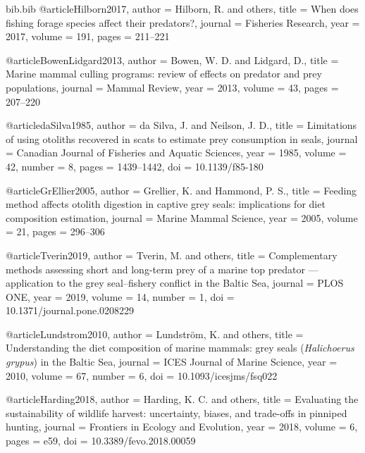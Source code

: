\begin{filecontents*}{bib.bib}
@article{Hilborn2017,
  author  = {Hilborn, R. and others},
  title   = {When does fishing forage species affect their predators?},
  journal = {Fisheries Research},
  year    = {2017},
  volume  = {191},
  pages   = {211--221}
}

@article{BowenLidgard2013,
  author  = {Bowen, W. D. and Lidgard, D.},
  title   = {Marine mammal culling programs: review of effects on predator and prey populations},
  journal = {Mammal Review},
  year    = {2013},
  volume  = {43},
  pages   = {207--220}
}

@article{daSilva1985,
  author  = {da Silva, J. and Neilson, J. D.},
  title   = {Limitations of using otoliths recovered in scats to estimate prey consumption in seals},
  journal = {Canadian Journal of Fisheries and Aquatic Sciences},
  year    = {1985},
  volume  = {42},
  number  = {8},
  pages   = {1439--1442},
  doi     = {10.1139/f85-180}
}

@article{GrEllier2005,
  author  = {Grellier, K. and Hammond, P. S.},
  title   = {Feeding method affects otolith digestion in captive grey seals: implications for diet composition estimation},
  journal = {Marine Mammal Science},
  year    = {2005},
  volume  = {21},
  pages   = {296--306}
}

@article{Tverin2019,
  author  = {Tverin, M. and others},
  title   = {Complementary methods assessing short and long-term prey of a marine top predator --- application to the grey seal--fishery conflict in the {B}altic {S}ea},
  journal = {PLOS ONE},
  year    = {2019},
  volume  = {14},
  number  = {1},
  doi     = {10.1371/journal.pone.0208229}
}

@article{Lundstrom2010,
  author  = {Lundstr{\"o}m, K. and others},
  title   = {Understanding the diet composition of marine mammals: grey seals (\textit{Halichoerus grypus}) in the {B}altic {S}ea},
  journal = {ICES Journal of Marine Science},
  year    = {2010},
  volume  = {67},
  number  = {6},
  doi     = {10.1093/icesjms/fsq022}
}

@article{Harding2018,
  author  = {Harding, K. C. and others},
  title   = {Evaluating the sustainability of wildlife harvest: uncertainty, biases, and trade-offs in pinniped hunting},
  journal = {Frontiers in Ecology and Evolution},
  year    = {2018},
  volume  = {6},
  pages   = {e59},
  doi     = {10.3389/fevo.2018.00059}
}

\end{filecontents*}

\documentclass[11pt]{article}
\usepackage[utf8]{inputenc}
\usepackage[margin=1.25in]{geometry}
\usepackage{amsmath, amsfonts, amssymb}
\usepackage{subfig}
\usepackage[dvipsnames]{xcolor}

